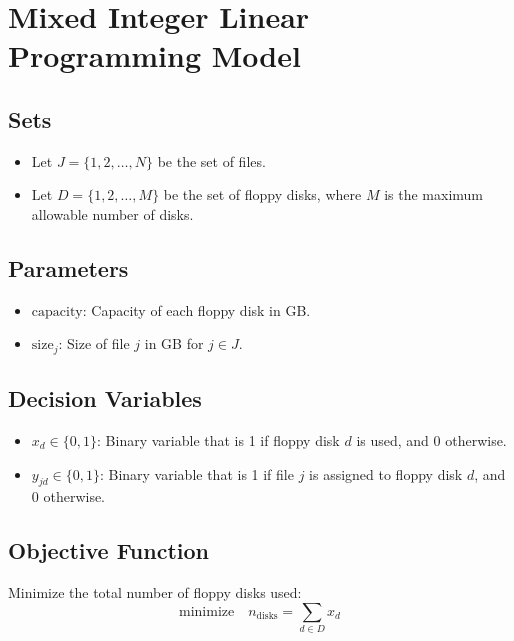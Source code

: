 \documentclass{article}
\begin{document}
\section*{Mixed Integer Linear Programming Model}

\subsection*{Sets}
\begin{itemize}
    \item Let \( J = \{ 1, 2, \ldots, N \} \) be the set of files.
    \item Let \( D = \{ 1, 2, \ldots, M \} \) be the set of floppy disks, where \( M \) is the maximum allowable number of disks.
\end{itemize}

\subsection*{Parameters}
\begin{itemize}
    \item \( \text{capacity} \): Capacity of each floppy disk in GB.
    \item \( \text{size}_j \): Size of file \( j \) in GB for \( j \in J \).
\end{itemize}

\subsection*{Decision Variables}
\begin{itemize}
    \item \( x_{d} \in \{0, 1\} \): Binary variable that is 1 if floppy disk \( d \) is used, and 0 otherwise.
    \item \( y_{jd} \in \{0, 1\} \): Binary variable that is 1 if file \( j \) is assigned to floppy disk \( d \), and 0 otherwise.
\end{itemize}

\subsection*{Objective Function}
Minimize the total number of floppy disks used:
\[
\text{minimize} \quad n_{\text{disks}} = \sum_{d \in D} x_d
\]
\end{document}
